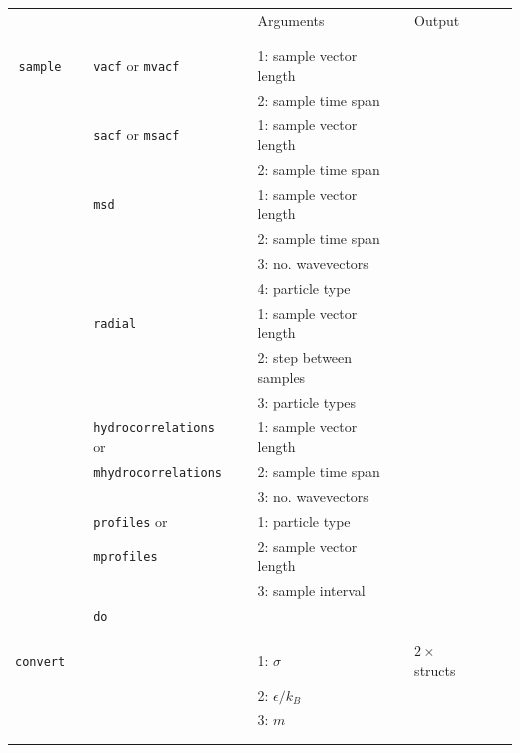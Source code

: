 \documentclass[11pt]{article}
\begin{document}
\begin{center}
  
  \begin{tabular}{cclclclll}
    {\color{red}{\textbf{Action}}} && {\color{blue}{Specifier}} && Arguments && Output \\
                                   && && && \\
    \hline
                                   && && && \\

    \verb!sample! && \verb!vacf! or \verb!mvacf! &&  1: sample vector length && \\
    $\mbox{}$   && &&  2: sample time span && \\
    $\mbox{}$   && \verb!sacf! or \verb!msacf! &&1: sample vector length && \\
    $\mbox{}$   &&                   &&  2: sample time span && \\
    $\mbox{}$   && \verb!msd! && 1: sample vector length && \\
    $\mbox{}$   &&            &&  2: sample time span && \\
    $\mbox{}$   &&            &&  3: no. wavevectors && \\
    $\mbox{}$   &&            &&  4: particle type && \\
    $\mbox{}$   && \verb!radial! &&  1: sample vector length && \\
    $\mbox{}$   &&            &&  2: step between samples  && \\
    $\mbox{}$   &&            &&  3: particle types && \\
    $\mbox{}$   && \verb!hydrocorrelations! or && 1: sample vector length && \\
    $\mbox{}$   && \verb!mhydrocorrelations!  &&  2: sample time span && \\
    $\mbox{}$   &&            &&  3: no. wavevectors && \\
    $\mbox{}$   && \verb!profiles! or &&1: particle type && \\
    $\mbox{}$   && \verb!mprofiles!    &&  2: sample vector length && \\
    $\mbox{}$   &&                   &&  3: sample interval && \\
    $\mbox{}$   && \verb!do!         &&  && \\
                                   && && && \\
    
    \hline
                                   && && && \\
    \verb!convert! && && 1: $\sigma$ && $2\times$ structs \\
    $\mbox{}$  && && 2: $\epsilon/k_B$ && \\
    $\mbox{}$  && && 3: $m$ && \\
                                   && && && \\
    \hline
                                   && && && \\
  \end{tabular}

\end{center}
\end{document}
